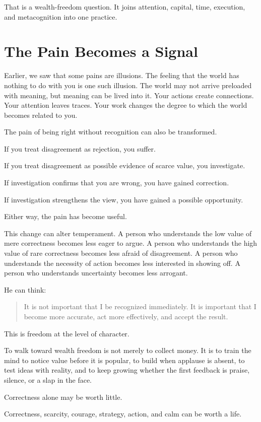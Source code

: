 That is a wealth-freedom question. It joins attention, capital, time, execution, and metacognition into one practice.

\section*{The Pain Becomes a Signal}

Earlier, we saw that some pains are illusions. The feeling that the world has nothing to do with you is one such illusion. The world may not arrive preloaded with meaning, but meaning can be lived into it. Your actions create connections. Your attention leaves traces. Your work changes the degree to which the world becomes related to you.

The pain of being right without recognition can also be transformed.

If you treat disagreement as rejection, you suffer.

If you treat disagreement as possible evidence of scarce value, you investigate.

If investigation confirms that you are wrong, you have gained correction.

If investigation strengthens the view, you have gained a possible opportunity.

Either way, the pain has become useful.

This change can alter temperament. A person who understands the low value of mere correctness becomes less eager to argue. A person who understands the high value of rare correctness becomes less afraid of disagreement. A person who understands the necessity of action becomes less interested in showing off. A person who understands uncertainty becomes less arrogant.

He can think:

\begin{quote}
It is not important that I be recognized immediately. It is important that I become more accurate, act more effectively, and accept the result.
\end{quote}

This is freedom at the level of character.

To walk toward wealth freedom is not merely to collect money. It is to train the mind to notice value before it is popular, to build when applause is absent, to test ideas with reality, and to keep growing whether the first feedback is praise, silence, or a slap in the face.

Correctness alone may be worth little.

Correctness, scarcity, courage, strategy, action, and calm can be worth a life.
